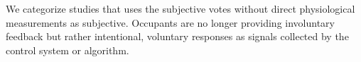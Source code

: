 We categorize studies that uses the subjective votes without direct physiological measurements as subjective. Occupants are no longer providing involuntary feedback but rather intentional, voluntary responses as signals collected by the control system or algorithm.


